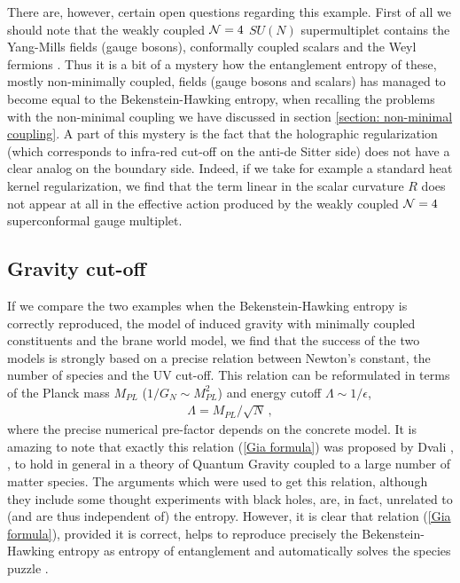 \documentclass[12pt]{article}
\def\be{\begin{eqnarray}}
\def\ee{\end{eqnarray}}
\def\lb{\label}
\begin{document}
 There are, however, certain open questions regarding this example. First of all we should note 
that the weakly coupled ${\cal N}=4$  $SU(N)$ supermultiplet contains the Yang-Mills fields (gauge bosons), conformally coupled scalars and the Weyl fermions \cite{Maldacena:1997re}.
Thus it is a bit of a mystery how the entanglement entropy of these, mostly non-minimally coupled, fields (gauge bosons and scalars) has managed to become equal to the Bekenstein-Hawking entropy, when recalling   the problems with the non-minimal coupling we have discussed in section \ref{section: non-minimal coupling}. A part of this mystery is the fact that the holographic regularization 
(which corresponds to infra-red cut-off on the anti-de Sitter side) does not have a clear analog on the boundary side. Indeed, if we take for example  a standard heat kernel regularization, we find that the term linear in the scalar curvature $R$ does not appear at all in the effective action produced by the weakly coupled ${\cal N}=4$ superconformal gauge multiplet.
 
 \subsection{Gravity  cut-off} 
If we compare the two examples when the Bekenstein-Hawking entropy is correctly reproduced, the model of induced gravity with minimally coupled constituents and the brane world model,
we find that the success of the two models is strongly based on a precise relation between Newton's constant, the number of species and the UV cut-off. This relation can be reformulated in terms of the Planck mass $M_{PL}$ ($1/G_N\sim M^2_{PL}$) and  energy cutoff $\Lambda\sim 1/\epsilon$,
\be
\Lambda=M_{PL}/\sqrt{N}\, ,
\lb{Gia formula}
\ee
where the precise numerical pre-factor depends on the concrete model. It is amazing to note that exactly this relation (\ref{Gia formula}) was proposed by Dvali \cite{Dvali:2007hz}, \cite{Dvali:2007wp}, \cite{Dvali:2008fd} to hold in general in a theory of Quantum Gravity coupled to a large number of matter species. 
The arguments which were used  to get this relation, although  they include some thought experiments with  black holes, are, in fact,  unrelated to (and are thus independent of) 
the entropy.
However, it is clear that relation (\ref{Gia formula}), provided it is correct,  helps to reproduce precisely  the Bekenstein-Hawking entropy as entropy of entanglement and 
automatically solves the species puzzle \cite{Dvali:2008jb}.
 
\end{document}
